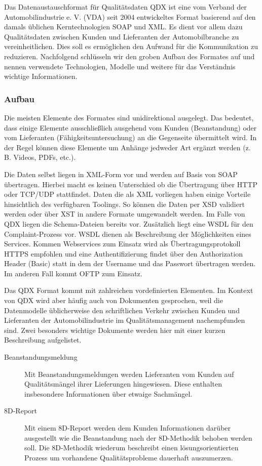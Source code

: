 Das Datenaustauschformat für Qualitätsdaten QDX ist eine vom Verband der Automobilindustrie e. V. (VDA) seit 2004 entwickeltes Format basierend auf den damals üblichen Kerntechnologien SOAP und XML. Es dient vor allem dazu Qualitätsdaten zwischen Kunden und Lieferanten der Automobilbranche zu vereinheitlichen. Dies soll es ermöglichen den Aufwand für die Kommunikation zu reduzieren.
Nachfolgend schlüsseln wir den groben Aufbau des Formates auf und nennen verwendete Technologien, Modelle und weitere für das Verständnis wichtige Informationen.

\subsubsection*{Aufbau}
Die meisten Elemente des Formates sind unidirektional ausgelegt. Das bedeutet, dass einige Elemente ausschließlich ausgehend vom Kunden (Beanstandung) oder vom Lieferanten (Fähigkeitsuntersuchung) an die Gegenseite übermittelt wird. In der Regel können diese Elemente um Anhänge jedweder Art ergänzt werden (z. B. Videos, PDFs, etc.).

Die Daten selbst liegen in XML-Form vor und werden auf Basis von SOAP übertragen. Hierbei macht es keinen Unterschied ob die Übertragung über HTTP oder TCP/UDP stattfindet. Daten die als XML vorliegen haben einige Vorteile hinsichtlich des verfügbaren Toolings. So können die Daten per XSD validiert werden oder über XST in andere Formate umgewandelt werden. Im Falle von QDX liegen die Schema-Dateien bereits vor.
Zusätzlich liegt eine WSDL für den Complaint-Prozess vor. WSDL dienen als Beschreibung der Möglichkeiten eines Services.
Kommen Webservices zum Einsatz wird als Übertragungsprotokoll HTTPS empfohlen und eine Authentifizierung findet über den Authorization Header (Basic) statt in dem der Username und das Passwort übertragen werden. Im anderen Fall kommt OFTP zum Einsatz.

Das QDX Format kommt mit zahlreichen vordefinierten Elementen. Im Kontext von QDX wird aber häufig auch von Dokumenten gesprochen, weil die Datenmodelle üblicherweise den schriftlichen Verkehr zwischen Kunden und Lieferanten der Automobilindustrie im Qualitätsmanagement nachempfunden sind. Zwei besonders wichtige Dokumente werden hier mit einer kurzen Beschreibung aufgelistet.

\begin{description}
    \item[Beanstandungsmeldung] Mit Beanstandungsmeldungen werden Lieferanten vom Kunden auf Qualitätsmängel ihrer Lieferungen hingewiesen. Diese enthalten insbesondere Informationen über etwaige Sachmängel.
    \item[8D-Report] Mit einem 8D-Report werden dem Kunden Informationen darüber ausgestellt wie die Beanstandung nach der 8D-Methodik behoben werden soll. Die 8D-Methodik wiederum beschreibt einen lösungsorientierten Prozess um vorhandene Qualitätsprobleme dauerhaft auszumerzen.
\end{description}

